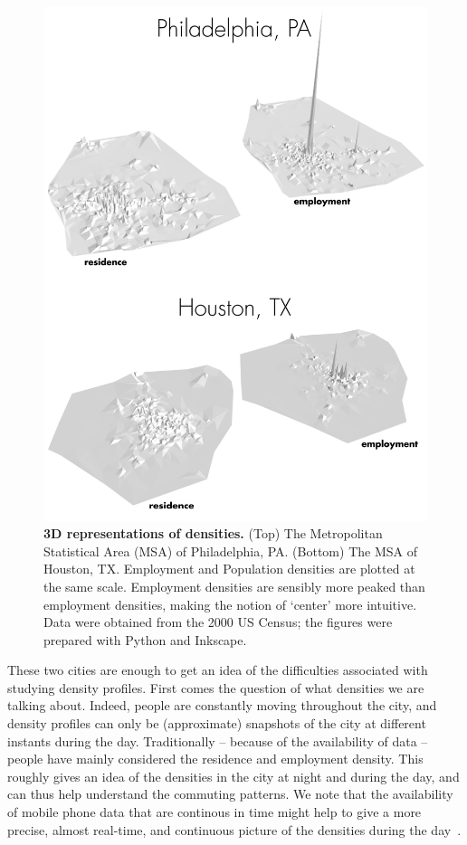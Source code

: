 \begin{figure}
    \centering
    \includegraphics[width=\textwidth]{gfx/chapter-monocentric/panel_3d.png}
    \caption{{\bf 3D representations of densities.} (Top) The Metropolitan
        Statistical Area (MSA) of Philadelphia, PA. (Bottom) The MSA of Houston,
    TX. Employment and Population densities are plotted at the same scale.
Employment densities are sensibly more peaked than employment densities, making
the notion of `center' more intuitive. Data were obtained from the 2000 US
Census; the figures were prepared with Python and Inkscape.
\label{fig:density_3d}}
\end{figure}


These two cities are enough to get an idea of the difficulties associated with
studying density profiles.
First comes the question of what densities we are talking about. Indeed, people
are constantly moving throughout the city, and density profiles can only be
(approximate) snapshots of the city at different instants during the day.
Traditionally -- because of the availability of data -- people have mainly
considered the residence and employment density. This roughly gives an idea of
the densities in the city at night and during the day, and can thus help
understand the commuting patterns. We note that the availability of mobile phone
data that are continous in time might help to give a more precise, almost
real-time, and continuous picture of the densities during the
day~\cite{Louail:2014}.\\

